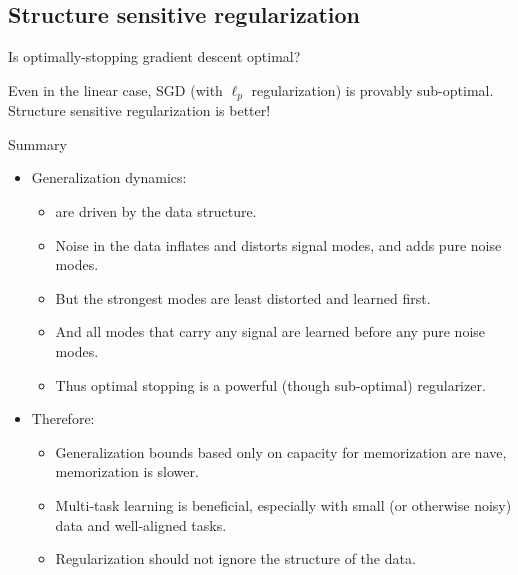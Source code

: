 \documentclass{beamer}
\begin{document}
\subsection{Structure sensitive regularization}
\begin{frame}{Is optimally-stopping gradient descent optimal?}
\end{frame}

\begin{frame}[standout]
Even in the linear case, SGD (with $\ell_p$ regularization) is provably sub-optimal.\\[1em]
Structure sensitive regularization is better!
\end{frame}

\begin{frame}{Summary}
\begin{itemize}[<+->]
\item Generalization dynamics:
    \begin{itemize}
    \item are driven by the data structure.
    \item Noise in the data inflates and distorts signal modes, and adds pure noise modes.
    \item But the strongest modes are least distorted and learned first.
    \item And all modes that carry any signal are learned before any pure noise modes.
    \item Thus optimal stopping is a powerful (though sub-optimal) regularizer.
    \end{itemize}
\item Therefore:
    \begin{itemize}
    \item Generalization bounds based only on capacity for memorization are nave, memorization is slower.
    \item Multi-task learning is beneficial, especially with small (or otherwise noisy) data and well-aligned tasks.
    \item Regularization should not ignore the structure of the data.
    \end{itemize}
\end{itemize}
\end{frame}
\end{document}
